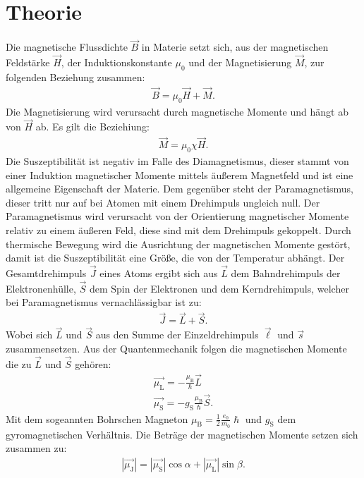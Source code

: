 \section{Theorie}
\label{sec:Theorie}
Die magnetische Flussdichte $\vec{B}$ in Materie setzt sich, aus der magnetischen Feldstärke $\vec{H}$,
der Induktionskonstante $\mu_\mathrm{0}$ und der Magnetisierung $\vec{M}$, zur
folgenden Beziehung zusammen:
\begin{align}
  \vec{B}=\mu_\mathrm{0}\vec{H}+\vec{M}.
\end{align}
Die Magnetisierung wird verursacht durch magnetische Momente und hängt ab
von $\vec{H}$ ab. Es gilt die Beziehiung:
\begin{align}
  \vec{M}=\mu_\mathrm{0}\chi\vec{H}.
\end{align}
Die Suszeptibilität ist negativ im Falle des Diamagnetismus,
dieser stammt von einer Induktion magnetischer Momente mittels äußerem
Magnetfeld und ist eine allgemeine Eigenschaft der Materie.
Dem gegenüber steht der Paramagnetismus, dieser tritt nur auf bei
Atomen mit einem Drehimpuls ungleich null. Der Paramagnetismus wird
verursacht von der Orientierung magnetischer Momente relativ
zu einem äußeren Feld, diese sind mit dem Drehimpuls gekoppelt.
Durch thermische Bewegung wird die Ausrichtung der magnetischen Momente
gestört, damit ist die Suszeptibilität eine Größe, die von der Temperatur
abhängt.
Der Gesamtdrehimpuls $\vec{J}$ eines Atoms ergibt sich aus
$\vec{L}$ dem Bahndrehimpuls der Elektronenhülle, $\vec{S}$ dem Spin
der Elektronen und dem Kerndrehimpuls, welcher bei Paramagnetismus
vernachlässigbar ist zu:
\begin{align}
  \vec{J}=\vec{L}+\vec{S}.
\end{align}
Wobei sich $\vec{L}$ und $\vec{S}$ aus den Summe der  Einzeldrehimpuls $\vec{\ell}$
und $\vec{s}$ zusammensetzen.
Aus der Quantenmechanik folgen die magnetischen Momente die zu $\vec{L}$ und $\vec{S}$
gehören:
\begin{align*}
  \vec{\mu_\mathrm{L}}=-\frac{\mu_\mathrm{B}}{\hslash}\vec{L}\\
  \vec{\mu_\mathrm{S}}=-g_\mathrm{S}\frac{\mu_\mathrm{B}}{\hslash}\vec{S}.
\end{align*}
Mit dem sogeannten Bohrschen Magneton $\mu_\mathrm{B}=\frac{1}{2}\frac{e_0}{m_0}\hslash$
und $g_\mathrm{S}$ dem gyromagnetischen Verhältnis.
Die Beträge der magnetischen Momente setzen sich zusammen zu:
\begin{align}
  |\vec{\mu_\mathrm{J}}|=|\vec{\mu_\mathrm{S}}|\cos{\alpha}+|\vec{\mu_\mathrm{L}}|\sin{\beta}.
\end{align}
